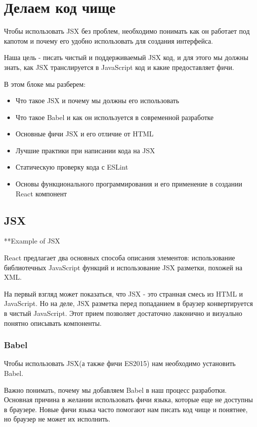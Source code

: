 \chapter{Делаем код чище}

Чтобы использовать JSX без проблем, необходимо понимать как он работает под капотом и почему его удобно использовать для создания интерфейса.

Наша цель - писать чистый и поддерживаемый JSX код, и для этого мы должны знать, как JSX транслируется в JavaScript код и какие предоставляет фичи.

В этом блоке мы разберем:

\begin{itemize}
  \item Что такое JSX и почему мы должны его использовать
  \item Что такое Babel и как он используется в современной разработке
  \item Основные фичи JSX и его отличие от HTML
  \item Лучшие практики при написании кода на JSX
  \item Статическую проверку кода с ESLint 
  \item Основы функционального программирования и его применение в создании React компонент
\end{itemize}


\section{JSX}

**Example of JSX

React предлагает два основных способа описания элементов: использование библиотечных JavaScript функций и использование JSX разметки, похожей на XML. 

На первый взгляд может показаться, что JSX - это странная смесь из HTML и JavaScript. Но на деле, JSX разметка перед попаданием в браузер конвертируется в чистый JavaScript. Этот прием позволяет достаточно лаконично и визуально понятно описывать компоненты.

\subsection*{Babel}

Чтобы использовать JSX(а также фичи ES2015) нам необходимо установить Babel. 

Важно понимать, почему мы добавляем Babel в наш процесс разработки. Основная причина в желании использовать фичи языка, которые еще не доступны в браузере. Новые фичи языка часто помогают нам писать код чище и понятнее, но браузер не может их исполнить.

